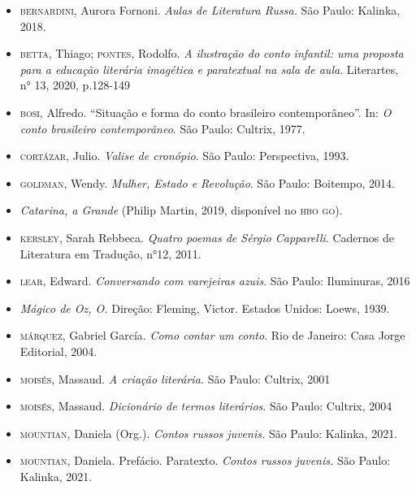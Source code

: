 \documentclass[11pt]{extarticle}
\begin{document}
\begin{itemize}
\item[]\textsc{bernardini}, Aurora Fornoni. \emph{Aulas de Literatura Russa.}
São Paulo: Kalinka, 2018.

\item[]\textsc{betta}, Thiago; \textsc{pontes}, Rodolfo. \emph{A ilustração do conto infantil:
uma proposta para a educação literária imagética e paratextual na sala
de aula}. Literartes, n° 13, 2020, p.128-149

\item[]\textsc{bosi}, Alfredo. ``Situação e forma do conto brasileiro contemporâneo''.
In: \emph{O conto brasileiro contemporâneo}. São Paulo: Cultrix, 1977.

\item[]\textsc{cortázar}, Julio. \emph{Valise de cronópio}. São Paulo: Perspectiva, 1993.

\item[]\textsc{goldman}, Wendy. \emph{Mulher, Estado e Revolução}. São Paulo: Boitempo,
2014.

\item[]\emph{Catarina, a Grande} (Philip Martin, 2019, disponível no \textsc{hbo go}).

\item[]\textsc{kersley}, Sarah Rebbeca. \emph{Quatro poemas de Sérgio Capparelli}.
Cadernos de Literatura em Tradução, n°12, 2011.

\item[]\textsc{lear}, Edward. \emph{Conversando com varejeiras azuis}. São Paulo:
Iluminuras, 2016

\item[]\emph{Mágico de Oz, O.} Direção: Fleming, Victor. Estados Unidos: Loews,
1939.

\item[]\textsc{márquez}, Gabriel García. \emph{Como contar um conto}. Rio de Janeiro:
Casa Jorge Editorial, 2004.

\item[]\textsc{moisés}, Massaud. \emph{A criação literária.} São Paulo: Cultrix, 2001

\item[]\textsc{moisés}, Massaud. \emph{Dicionário de termos literários}. São Paulo:
Cultrix, 2004

\item[]\textsc{mountian}, Daniela (Org.). \emph{Contos russos juvenis.} São Paulo:
Kalinka, 2021.

\item[]\textsc{mountian}, Daniela. Prefácio. Paratexto. \emph{Contos russos juvenis.}
São Paulo: Kalinka, 2021.


\end{itemize}
\end{document}
